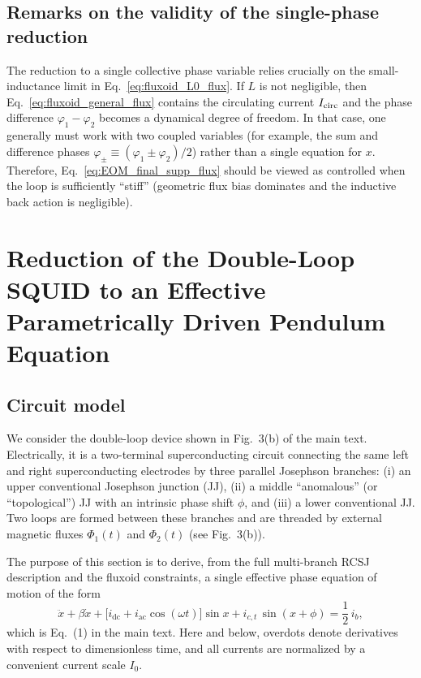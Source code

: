 \documentclass[prl,twocolumn,superscriptaddress,showpacs,nofootinbib]{revtex4-2}
\begin{document}
\subsection{Remarks on the validity of the single-phase reduction}

The reduction to a single collective phase variable relies crucially on the small-inductance limit in Eq.~\eqref{eq:fluxoid_L0_flux}. If $L$ is not negligible, then Eq.~\eqref{eq:fluxoid_general_flux} contains the circulating current $I_{\rm circ}$ and the phase difference $\varphi_1-\varphi_2$ becomes a dynamical degree of freedom. In that case, one generally must work with
two coupled variables (for example, the sum and difference phases
$\varphi_\pm\equiv(\varphi_1\pm\varphi_2)/2$) rather than a single equation for $x$. Therefore, Eq.~\eqref{eq:EOM_final_supp_flux} should be viewed as controlled when the loop is sufficiently ``stiff'' (geometric flux bias dominates and the inductive back action is negligible).




\section{Reduction of the Double-Loop SQUID to an Effective
Parametrically Driven Pendulum Equation}
\label{sec:SM_reduction}


\subsection{Circuit model}
We consider the double-loop device shown in Fig.~3(b) of the main text.
Electrically, it is a two-terminal superconducting circuit connecting the same left and right superconducting electrodes by three parallel Josephson branches:
(i) an upper conventional Josephson junction (JJ), (ii) a middle ``anomalous'' (or ``topological'') JJ with an intrinsic phase shift $\phi$, and (iii) a lower conventional JJ. Two loops are formed between these branches and are threaded
by external magnetic fluxes $\Phi_1(t)$ and $\Phi_2(t)$ (see Fig.~3(b)).

The purpose of this section is to derive, from the full multi-branch RCSJ description and the fluxoid constraints, a single effective phase equation of motion of the form
\begin{equation}
\ddot x + \beta \dot x
+ \big[i_{\mathrm{dc}}+i_{\mathrm{ac}}\cos(\omega t)\big]\sin x
+ i_{c,t}\,\sin(x+\phi)
= \frac{1}{2}\,i_b,
\label{eq:EOM_SM_target}
\end{equation}
which is Eq.~(1) in the main text. Here and below, overdots denote derivatives with respect to dimensionless time, and all currents are normalized by a convenient current scale $I_0$.
\end{document}
